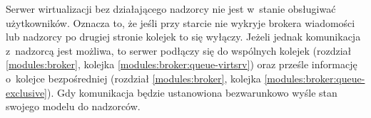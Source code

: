 \documentclass[../opis-rozwiazania.tex]{subfiles}
\begin{document}
Serwer wirtualizacji bez działającego nadzorcy nie jest w~stanie obsługiwać użytkowników.
Oznacza to, że jeśli przy starcie nie wykryje brokera wiadomości
lub nadzorcy po drugiej stronie kolejek \parencite{rabbit-ack} to się wyłączy.
Jeżeli jednak komunikacja z~nadzorcą jest możliwa, to serwer podłączy się do wspólnych kolejek (rozdział \ref{modules:broker}, kolejka \ref{modules:broker:queue-virtsrv})
oraz prześle informację o~kolejce bezpośredniej (rozdział \ref{modules:broker}, kolejka \ref{modules:broker:queue-exclusive}).
Gdy komunikacja będzie ustanowiona bezwarunkowo wyśle stan swojego modelu do nadzorców.
\end{document}

